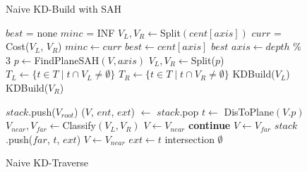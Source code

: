 \documentclass{article}
\begin{document}
\begin{figure}[h!]
\begin{minipage}[t]{3.35in}
\linespread{1.00}
\begin{algorithm}[H]
\caption{Naive KD-Build with SAH} 
\label{alg1} 
\begin{algorithmic}
        \State $best$ = none
        \State $minc$ = INF
            \State $V_L, V_R \gets $Split$(cent[axis])$
            \State $curr$ = Cost($V_L$, $V_R$)
                \State $minc \gets curr$
                \State $best \gets cent[axis]$
            \EndIf
        \EndFor
        \State \Return $best$
    \EndFunction
    \vspace{0.05cm}
            \State \Return
        \EndIf
        \State $axis \gets depth$ \% 3
        \State $p \gets $FindPlaneSAH$(V, axis)$
        \State $V_L, V_R \gets $Split($p$)
        \State $T_L \gets \{t \in T \mid t \cap V_L \neq \emptyset\}$
        \State $T_R \gets \{t \in T \mid t \cap V_R \neq \emptyset\}$
        \State KDBuild($V_L$)
        \State KDBuild($V_R$)
    \EndFunction
\end{algorithmic}
\end{algorithm}
\end{minipage}
\hfill
\begin{minipage}[t]{3.35in}
\linespread{1.00}
\begin{algorithm}[H]
\caption{Naive KD-Traverse} 
\label{alg2} 
\begin{algorithmic}
        \State $stack$.push($V_{root}$) 
            \State ($V$, $ent$, $ext$) $\gets$ $stack$.pop
                \State $t \gets$ DisToPlane$(V.p)$
                \State $V_{near}, V_{far} \gets $Classify$(V_L, V_R)$
                    \State $V \gets V_{near}$
                    \State \textbf{continue}
                \EndIf
                    \State $V \gets V_{far}$
                \Else{}
                    \State $stack$.push($far$, $t$, $ext$)
                    \State $V \gets V_{near}$
                    \State $ext \gets t$
                \EndIf
            \EndWhile
                \State \Return intersection
            \EndIf
        \EndWhile
        \State \Return $\emptyset$
    \EndFunction
\end{algorithmic}
\vspace{17pt}
\end{algorithm}
\end{minipage}
\hfill
\end{figure}
\end{document}
